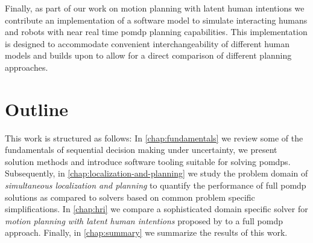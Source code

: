 Finally, as part of our work on motion planning with latent human intentions
we contribute an implementation of a software model to simulate
interacting humans and robots with near real time \ac{pomdp} planning
capabilities. This implementation is designed to accommodate convenient
interchangeability of different human models and builds upon \pomdpsjl to allow
for a direct comparison of different planning approaches.

\section{Outline}

This work is structured as follows: In \cref{chap:fundamentals} we review some
of the fundamentals of sequential decision making under uncertainty, we present
solution methods and introduce software tooling suitable for solving
\acp{pomdp}. Subsequently, in \cref{chap:localization-and-planning} we study
the problem domain of \emph{simultaneous localization and planning} to quantify
the performance of full \ac{pomdp} solutions as compared to solvers based on
common problem specific simplifications.  In \cref{chap:hri} we compare
a sophisticated domain specific solver for \emph{motion planning with latent
human intentions} proposed by \cite{fisac2018probabilistically} to a full
\ac{pomdp} approach. Finally, in \cref{chap:summary} we summarize the results
of this work.
